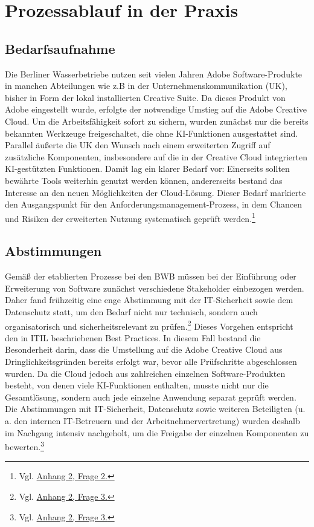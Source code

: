 \documentclass[
    12pt, 
    a4paper,
    ]{scrartcl} %
\begin{document}
\section{Prozessablauf in der Praxis}
\subsection{Bedarfsaufnahme}
Die Berliner Wasserbetriebe nutzen seit vielen Jahren Adobe Software-Produkte in manchen Abteilungen wie z.B in der Unternehmenskommunikation (UK), bisher in Form der lokal installierten Creative Suite. Da dieses Produkt von Adobe eingestellt wurde, erfolgte der notwendige Umstieg auf die Adobe Creative Cloud. Um die Arbeitsfähigkeit sofort zu sichern, wurden zunächst nur die bereits bekannten Werkzeuge freigeschaltet, die ohne KI-Funktionen ausgestattet sind.
Parallel äußerte die UK den Wunsch nach einem erweiterten Zugriff auf zusätzliche Komponenten, insbesondere auf die in der Creative Cloud integrierten KI-gestützten Funktionen. Damit lag ein klarer Bedarf vor: Einerseits sollten bewährte Tools weiterhin genutzt werden können, andererseits bestand das Interesse an den neuen Möglichkeiten der Cloud-Lösung. Dieser Bedarf markierte den Ausgangspunkt für den Anforderungsmanagement-Prozess, in dem Chancen und Risiken der erweiterten Nutzung systematisch geprüft werden.\footnote{Vgl. \hyperref[sec:Anhang2]{Anhang 2, Frage 2.}}

\subsection{Abstimmungen}

Gemäß der etablierten Prozesse bei den BWB müssen bei der Einführung oder Erweiterung von Software zunächst verschiedene Stakeholder einbezogen werden. Daher fand frühzeitig eine enge Abstimmung mit der IT-Sicherheit sowie dem Datenschutz statt, um den Bedarf nicht nur technisch, sondern auch organisatorisch und sicherheitsrelevant zu prüfen.\footnote{Vgl. \hyperref[sec:Anhang2]{Anhang 2, Frage 3.}} Dieses Vorgehen entspricht den in ITIL beschriebenen Best Practices.
In diesem Fall bestand die Besonderheit darin, dass die Umstellung auf die Adobe Creative Cloud aus Dringlichkeitsgründen bereits erfolgt war, bevor alle Prüfschritte abgeschlossen wurden. Da die Cloud jedoch aus zahlreichen einzelnen Software-Produkten besteht, von denen viele KI-Funktionen enthalten, musste nicht nur die Gesamtlösung, sondern auch jede einzelne Anwendung separat geprüft werden. Die Abstimmungen mit IT-Sicherheit, Datenschutz sowie weiteren Beteiligten (u. a. den internen IT-Betreuern und der Arbeitnehmervertretung) wurden deshalb im Nachgang intensiv nachgeholt, um die Freigabe der einzelnen Komponenten zu bewerten.\footnote{Vgl. \hyperref[sec:Anhang2]{Anhang 2, Frage 3.}}
\end{document}
